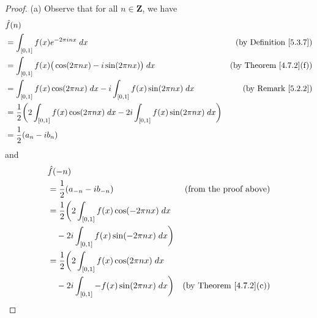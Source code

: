 \begin{proof}{(a)}
    Observe that for all \(n \in \mathbf{Z}\), we have
    \begin{align*}
         & \hat{f}(n)                                                                                                                                              \\
         & = \int_{[0, 1]} f(x) e^{- 2 \pi i n x} \; dx                                                                       & \text{(by Definition \ref{5.3.7})} \\
         & = \int_{[0, 1]} f(x) \big(\cos(2 \pi n x) - i \sin(2 \pi n x)\big) \; dx                                           & \text{(by Theorem \ref{4.7.2}(f))} \\
         & = \int_{[0, 1]} f(x) \cos(2 \pi n x) \; dx - i \int_{[0, 1]} f(x) \sin(2 \pi n x) \; dx                            & \text{(by Remark \ref{5.2.2})}     \\
         & = \frac{1}{2} \bigg(2 \int_{[0, 1]} f(x) \cos(2 \pi n x) \; dx - 2i \int_{[0, 1]} f(x) \sin(2 \pi n x) \; dx\bigg)                                      \\
         & = \frac{1}{2} (a_n - i b_n)
    \end{align*}
    and
    \begin{align*}
         & \hat{f}(-n)                                                                                                                                             \\
         & = \frac{1}{2} (a_{-n} - i b_{-n})                                                                                  & \text{(from the proof above)}      \\
         & = \frac{1}{2} \bigg(2 \int_{[0, 1]} f(x) \cos(- 2 \pi n x) \; dx                                                                                        \\
         & \quad - 2i \int_{[0, 1]} f(x) \sin(- 2 \pi n x) \; dx\bigg)                                                                                             \\
         & = \frac{1}{2} \bigg(2 \int_{[0, 1]} f(x) \cos(2 \pi n x) \; dx                                                                                          \\
         & \quad - 2i \int_{[0, 1]} -f(x) \sin(2 \pi n x) \; dx\bigg)                                                         & \text{(by Theorem \ref{4.7.2}(c))} \\

\end{align*}
\end{proof}
